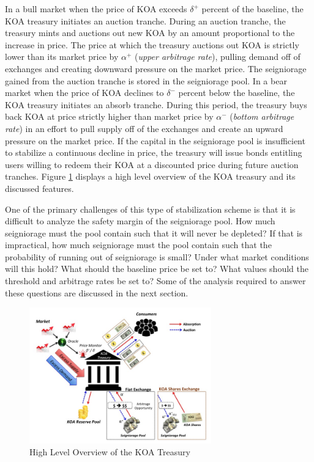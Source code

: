In a bull market when the price of KOA exceeds $\delta^+$ percent of the baseline, the KOA treasury initiates an auction tranche. During an auction tranche, the treasury mints and auctions out new KOA by an amount proportional to the increase in price. The price at which the treasury auctions out KOA is strictly lower than its market price by $\alpha^+$ (\textit{upper arbitrage rate}), pulling demand off of exchanges and creating downward pressure on the market price. The seigniorage gained from the auction tranche is stored in the seigniorage pool.
%
In a bear market when the price of KOA declines to $\delta^-$ percent below the baseline, the KOA treasury initiates an absorb tranche. During this period, the treasury buys back  KOA at price strictly higher than market price by $\alpha^-$ (\textit{bottom arbitrage rate}) in an effort to pull supply off of the exchanges and create an upward pressure on the market price. If the capital in the seigniorage pool is insufficient to stabilize a continuous decline in price, the treasury will issue bonds entitling users willing to redeem their KOA at a discounted price during future auction tranches. Figure \ref{fig:treasury} displays a high level overview of the KOA treasury and its discussed features.

One of the primary challenges of this type of stabilization scheme is that it is difficult to analyze the safety margin of the seigniorage pool. How much seigniorage must the pool contain such that it will never be depleted? If that is impractical, how much seigniorage must the pool contain such that the probability of running out of seigniorage is small? Under what market conditions will this hold? What should the baseline price be set to? What values should the threshold and arbitrage rates be set to? Some of the analysis required to answer these questions are discussed in the next section.
%
\begin{figure}[] %
    \centering
        \includegraphics[keepaspectratio, width=0.7\textwidth]{images/treasury.jpg}
    \caption{High Level Overview of the KOA Treasury} \label{fig:treasury}
\end{figure}

